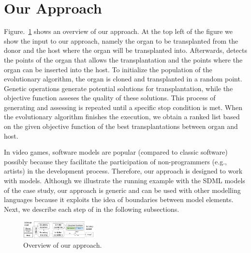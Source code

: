 \section{Our \ApproachName{} Approach} 
\label{sec:Approach}


Figure.~\ref{fig:approach} shows an overview of our approach.
At the top left of the figure we show the input to our approach, namely the organ to be transplanted from the donor and the host where the organ will be transplanted into. Afterwards, \ApproachName{} detects the points of the organ that allows the transplantation and the points where the organ can be inserted into the host. To initialize the population of the evolutionary algorithm, the organ is cloned and transplanted in a random point. Genetic operations generate potential solutions for transplantation, while the objective function asseses the quality of these solutions. This process of generating and assessing is repeated until a specific stop condition is met. When the evolutionary algorithm finishes the execution, we obtain a ranked list based on the given objective function of the best transplantations between organ and host.

In video games, software models are popular (compared to classic software) possibly because they facilitate the participation of non-programmers (e.g., artists) in the development process. Therefore, our \ApproachName{} approach is designed to work with models. Although we illustrate the running example with the SDML models of the case study, our approach is generic and can be used with other modelling languages because it exploits the idea of boundaries between model elements.
Next, we describe each step of \ApproachName{} in the following subsections.

\begin{figure}[tb]
    \centering
    \includegraphics[width=0.35\textwidth]{Figures/overview.png}
    \caption{Overview of our \ApproachName{} approach.}
    \label{fig:approach}
\end{figure}


